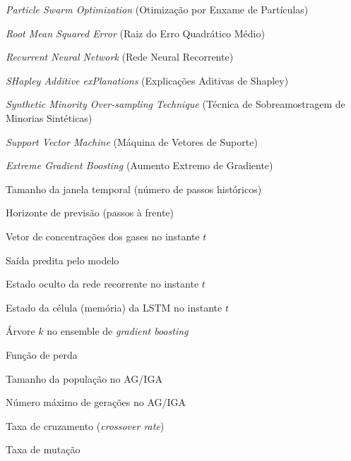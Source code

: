 \begin{siglas}
  \item[PSO] \textit{Particle Swarm Optimization} (Otimização por Enxame de Partículas)
  \item[RMSE] \textit{Root Mean Squared Error} (Raiz do Erro Quadrático Médio)
  \item[RNN] \textit{Recurrent Neural Network} (Rede Neural Recorrente)
  \item[SHAP] \textit{SHapley Additive exPlanations} (Explicações Aditivas de Shapley)
  \item[SMOTE] \textit{Synthetic Minority Over-sampling Technique} (Técnica de Sobreamostragem de Minorias Sintéticas)
  \item[SVM] \textit{Support Vector Machine} (Máquina de Vetores de Suporte)
  \item[XGBoost] \textit{Extreme Gradient Boosting} (Aumento Extremo de Gradiente)
\end{siglas}

\begin{simbolos}
  \item[$w$] Tamanho da janela temporal (número de passos históricos)
  \item[$h$] Horizonte de previsão (passos à frente)
  \item[$x_t$] Vetor de concentrações dos gases no instante $t$
  \item[$\hat{y}$] Saída predita pelo modelo
  \item[$h_t$] Estado oculto da rede recorrente no instante $t$
  \item[$C_t$] Estado da célula (memória) da LSTM no instante $t$
  \item[$f_k(x)$] Árvore $k$ no ensemble de \textit{gradient boosting}
  \item[$L(y,\hat{y})$] Função de perda
  \item[$N$] Tamanho da população no AG/IGA
  \item[$G$] Número máximo de gerações no AG/IGA
  \item[$P_c$] Taxa de cruzamento (\textit{crossover rate})
  \item[$P_m$] Taxa de mutação
\end{simbolos}

\tableofcontents*
\cleardoublepage
